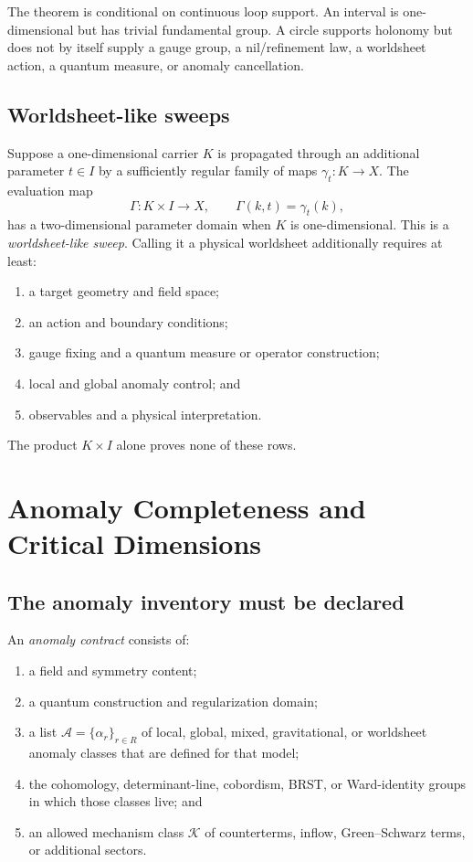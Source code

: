 \documentclass[11pt]{article}
\newcommand{\Anom}{\mathcal A}
\newcommand{\Mechanisms}{\mathcal K}
\begin{document}
\begin{remark}
The theorem is conditional on continuous loop support.  An interval is
one-dimensional but has trivial fundamental group.  A circle supports
holonomy but does not by itself supply a gauge group, a nil/refinement law, a
worldsheet action, a quantum measure, or anomaly cancellation.
\end{remark}

\subsection{Worldsheet-like sweeps}

Suppose a one-dimensional carrier $K$ is propagated through an additional
parameter $t\in I$ by a sufficiently regular family of maps
$\gamma_t:K\to X$.  The evaluation map
\[
 \Gamma:K\times I\longrightarrow X,
 \qquad
 \Gamma(k,t)=\gamma_t(k),
\]
has a two-dimensional parameter domain when $K$ is one-dimensional.  This is
a \emph{worldsheet-like sweep}.  Calling it a physical worldsheet additionally
requires at least:
\begin{enumerate}
\item a target geometry and field space;
\item an action and boundary conditions;
\item gauge fixing and a quantum measure or operator construction;
\item local and global anomaly control; and
\item observables and a physical interpretation.
\end{enumerate}
The product $K\times I$ alone proves none of these rows.

\section{Anomaly Completeness and Critical Dimensions}

\subsection{The anomaly inventory must be declared}

\begin{definition}\label{def:anomaly-contract}
An \emph{anomaly contract} consists of:
\begin{enumerate}
\item a field and symmetry content;
\item a quantum construction and regularization domain;
\item a list $\Anom=\{\alpha_r\}_{r\in R}$ of local, global, mixed,
gravitational, or worldsheet anomaly classes that are defined for that model;
\item the cohomology, determinant-line, cobordism, BRST, or Ward-identity
groups in which those classes live; and
\item an allowed mechanism class $\Mechanisms$ of counterterms, inflow,
Green--Schwarz terms, or additional sectors.
\end{enumerate}
\end{definition}
\end{document}

